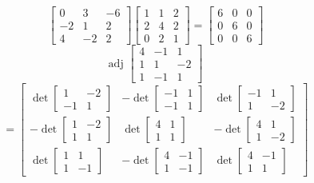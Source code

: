 \begin{itemize}
$$\begin{bmatrix}
0 & 3 & -6 \\
-2 & 1 & 2 \\
4 & -2 & 2
\end{bmatrix}\begin{bmatrix}
1 & 1 & 2 \\
2 & 4 & 2 \\
0 & 2 & 1
\end{bmatrix} = \begin{bmatrix}
6 & 0 & 0 \\
0 & 6 & 0 \\
0 & 0 & 6
\end{bmatrix}$$
$$\text{adj }\begin{bmatrix}
4 & -1 & 1 \\
1 & 1 & -2 \\
1 & -1 & 1
\end{bmatrix}$$
$$= \begin{bmatrix}
\det\begin{bmatrix}
1 & -2 \\
-1 & 1
\end{bmatrix} & -\det\begin{bmatrix}
-1 & 1 \\
-1 & 1
\end{bmatrix} & \det\begin{bmatrix}
-1 & 1 \\
1 & -2
\end{bmatrix} \\
-\det\begin{bmatrix}
1 & -2 \\
1 & 1
\end{bmatrix} & \det\begin{bmatrix}
4 & 1 \\
1 & 1
\end{bmatrix} & -\det\begin{bmatrix}
4 & 1 \\
1 & -2
\end{bmatrix} \\
\det\begin{bmatrix}
1 & 1 \\
1 & -1
\end{bmatrix} & -\det\begin{bmatrix}
4 & -1 \\
1 & -1
\end{bmatrix} & \det\begin{bmatrix}
4 & -1 \\
1 & 1
\end{bmatrix}

\end{bmatrix}$$
\end{itemize}
